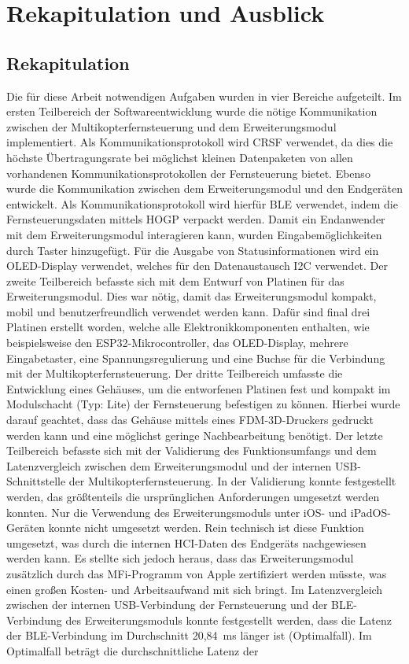 
\chapter{Rekapitulation und Ausblick}
\section{Rekapitulation}

Die für diese Arbeit notwendigen Aufgaben wurden in vier Bereiche aufgeteilt. Im ersten Teilbereich der Softwareentwicklung wurde die nötige Kommunikation zwischen der Multikopterfernsteuerung und dem Erweiterungsmodul implementiert. Als Kommunikationsprotokoll wird CRSF verwendet, da dies die höchste Übertragungsrate bei möglichst kleinen Datenpaketen von allen vorhandenen Kommunikationsprotokollen der Fernsteuerung bietet. Ebenso wurde die Kommunikation zwischen dem Erweiterungsmodul und den Endgeräten entwickelt. Als Kommunikationsprotokoll wird hierfür \ac{BLE} verwendet, indem die Fernsteuerungsdaten mittels \ac{HOGP} verpackt werden. Damit ein Endanwender mit dem Erweiterungsmodul interagieren kann, wurden Eingabemöglichkeiten durch Taster hinzugefügt. Für die Ausgabe von Statusinformationen wird ein \acs{OLED}-Display verwendet, welches für den Datenaustausch \ac{I2C} verwendet. Der zweite Teilbereich befasste sich mit dem Entwurf von Platinen für das Erweiterungsmodul. Dies war nötig, damit das Erweiterungsmodul kompakt, mobil und benutzerfreundlich verwendet werden kann. Dafür sind final drei Platinen erstellt worden, welche alle Elektronikkomponenten enthalten, wie beispielsweise den ESP32-Mikrocontroller, das \acs{OLED}-Display, mehrere Eingabetaster, eine Spannungsregulierung und eine Buchse für die Verbindung mit der Multikopterfernsteuerung. Der dritte Teilbereich umfasste die Entwicklung eines Gehäuses, um die entworfenen Platinen fest und kompakt im Modulschacht (Typ: Lite) der Fernsteuerung befestigen zu können. Hierbei wurde darauf geachtet, dass das Gehäuse mittels eines \ac{FDM}-3D-Druckers gedruckt werden kann und eine möglichst geringe Nachbearbeitung benötigt. Der letzte Teilbereich befasste sich mit der Validierung des Funktionsumfangs und dem Latenzvergleich zwischen dem Erweiterungsmodul und der internen \acs{USB}-Schnittstelle der Multikopterfernsteuerung. In der Validierung konnte festgestellt werden, das größtenteils die ursprünglichen Anforderungen umgesetzt werden konnten. Nur  die Verwendung des Erweiterungsmoduls unter iOS- und iPadOS-Geräten konnte nicht umgesetzt werden. Rein technisch ist diese Funktion umgesetzt, was durch die internen \ac{HCI}-Daten des Endgeräts nachgewiesen werden kann. Es stellte sich jedoch heraus, dass das Erweiterungsmodul zusätzlich durch das \ac{MFi}-Programm von Apple zertifiziert werden müsste, was einen großen Kosten- und Arbeitsaufwand mit sich bringt. Im Latenzvergleich zwischen der internen \acs{USB}-Verbindung der Fernsteuerung und der \ac{BLE}-Verbindung des Erweiterungsmoduls konnte festgestellt werden, dass die Latenz der \ac{BLE}-Verbindung im Durchschnitt 20,84~ms länger ist (Optimalfall). Im Optimalfall beträgt die durchschnittliche Latenz der 